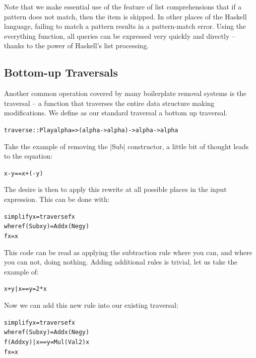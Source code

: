 \documentclass[preprint]{sigplanconf}
\newcommand{\C}[1]{\textsf{#1}}
\newenvironment{code}{\begin{alltt}\small}{\end{alltt}}
\begin{document}
Note that we make essential use of the feature of list comprehensions that if a pattern does not match, then the item is skipped. In other places of the Haskell language, failing to match a pattern results in a pattern-match error. Using the \C{everything} function, all queries can be expressed very quickly and directly -- thanks to the power of Haskell's list processing.

\subsection{Bottom-up Traversals}

Another common operation covered by many boilerplate removal systems is the traversal -- a function that traverses the entire data structure making modifications. We define as our standard traversal a bottom up traversal.

\begin{code}
traverse :: Play alpha => (alpha -> alpha) -> alpha -> alpha
\end{code}

Take the example of removing the |Sub| constructor, a little bit of thought leads to the equation:

\begin{code}
x - y == x + (- y)
\end{code}

The desire is then to apply this rewrite at all possible places in the input expression. This can be done with:

\begin{code}
simplify x = traverse f x
    where  f (Sub x y)  = Add x (Neg y)
           f x          = x
\end{code}

This code can be read as applying the subtraction rule where you can, and where you can not, doing nothing. Adding additional rules is trivial, let us take the example of:

\begin{code}
x + y | x == y = 2 * x
\end{code}

Now we can add this new rule into our existing traversal:

\begin{code}
simplify x = traverse f x
    where  f (Sub x y)           = Add x (Neg y)
           f (Add x y) | x == y  = Mul (Val 2) x
           f x                   = x
\end{code}
\end{document}
